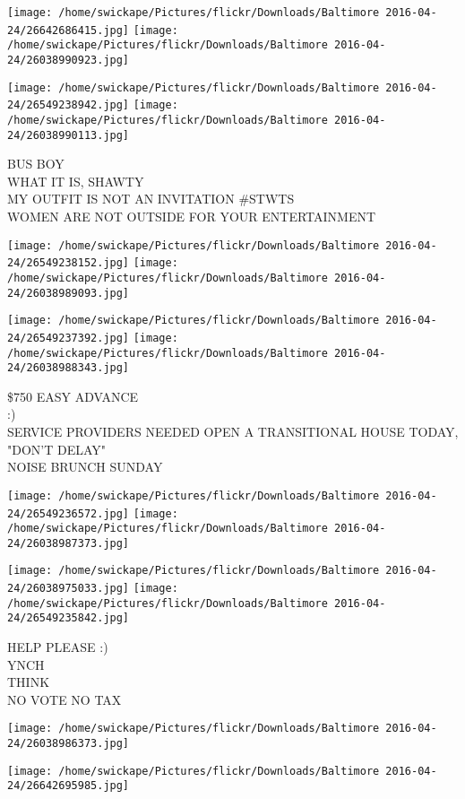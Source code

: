 \documentclass[10pt,letterpaper]{article}
\begin{document}
\texttt{[image: /home/swickape/Pictures/flickr/Downloads/Baltimore 2016-04-24/26642686415.jpg]}
\texttt{[image: /home/swickape/Pictures/flickr/Downloads/Baltimore 2016-04-24/26038990923.jpg]}

\texttt{[image: /home/swickape/Pictures/flickr/Downloads/Baltimore 2016-04-24/26549238942.jpg]}
\texttt{[image: /home/swickape/Pictures/flickr/Downloads/Baltimore 2016-04-24/26038990113.jpg]}

BUS BOY\\
WHAT IT IS, SHAWTY\\
MY OUTFIT IS NOT AN INVITATION \#STWTS\\
WOMEN ARE NOT OUTSIDE FOR YOUR ENTERTAINMENT
\pagebreak

\texttt{[image: /home/swickape/Pictures/flickr/Downloads/Baltimore 2016-04-24/26549238152.jpg]}
\texttt{[image: /home/swickape/Pictures/flickr/Downloads/Baltimore 2016-04-24/26038989093.jpg]}

\texttt{[image: /home/swickape/Pictures/flickr/Downloads/Baltimore 2016-04-24/26549237392.jpg]}
\texttt{[image: /home/swickape/Pictures/flickr/Downloads/Baltimore 2016-04-24/26038988343.jpg]}

\$750 EASY ADVANCE\\
:)\\
SERVICE PROVIDERS NEEDED OPEN A TRANSITIONAL HOUSE TODAY, "DON'T DELAY"\\
NOISE BRUNCH SUNDAY
\pagebreak

\texttt{[image: /home/swickape/Pictures/flickr/Downloads/Baltimore 2016-04-24/26549236572.jpg]}
\texttt{[image: /home/swickape/Pictures/flickr/Downloads/Baltimore 2016-04-24/26038987373.jpg]}

\texttt{[image: /home/swickape/Pictures/flickr/Downloads/Baltimore 2016-04-24/26038975033.jpg]}
\texttt{[image: /home/swickape/Pictures/flickr/Downloads/Baltimore 2016-04-24/26549235842.jpg]}

HELP PLEASE :)\\
YNCH\\
THINK\\
NO VOTE NO TAX
\pagebreak

\texttt{[image: /home/swickape/Pictures/flickr/Downloads/Baltimore 2016-04-24/26038986373.jpg]}

\vspace{0.25in}
\texttt{[image: /home/swickape/Pictures/flickr/Downloads/Baltimore 2016-04-24/26642695985.jpg]}
\end{document}

